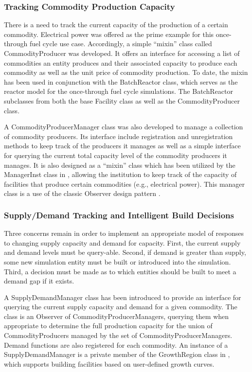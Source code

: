 \subsubsection{Tracking Commodity Production Capacity}

There is a need to track the current capacity of the production of a certain
commodity. Electrical power was offered as the prime example for this
once-through fuel cycle use case. Accordingly, a simple ``mixin'' class
\cite{ulrich_mixin-based_2001} called CommodityProducer was developed. It offers
an interface for accessing a list of commodities an entity produces and their
associated capacity to produce each commodity as well as the unit price of
commodity production. To date, the mixin has been used in conjunction with the
BatchReactor class, which serves as the reactor model for the once-through fuel
cycle simulations. The BatchReactor subclasses from both the base Facility class
as well as the CommodityProducer class.

A CommodityProducerManager class was also developed to manage a collection of
commodity producers. Its interface include registration and unregistration
methods to keep track of the producers it manages as well as a simple interface
for querying the current total capacity level of the commodity producers it
manages. It is also designed as a ``mixin'' class which has been utilized by the
ManagerInst class in \Cycamore, allowing the institution to keep track of the
capacity of facilities that produce certain commodities (e.g., electrical
power). This manager class is a use of the classic Observer design pattern
\cite{vlissides_design_1995}.

\subsubsection{Supply/Demand Tracking and Intelligent Build Decisions}

Three concerns remain in order to implement an appropriate model of responses to
changing supply capacity and demand for capacity. First, the current supply and
demand levels must be query-able. Second, if demand is greater than supply, some
new simulation entity must be built or introduced into the simulation. Third, a
decision must be made as to which entities should be built to meet a demand gap
if it exists.

A SupplyDemandManager class has been introduced to provide an interface for
querying the current supply capacity and demand for a given commodity. The class
is an Observer of CommodityProducerManagers, querying them when appropriate to
determine the full production capacity for the union of CommodityProducers
managed by the set of CommodityProducerManagers. Demand functions are also
registered for each commodity. An instance of a SupplyDemandManager is a private
member of the GrowthRegion class in \Cycamore, which supports building
facilities based on user-defined growth curves.


